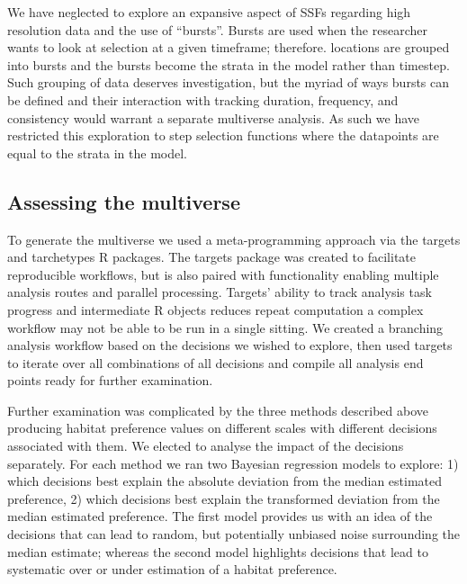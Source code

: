 \documentclass[10pt,a4paper]{article}
\begin{document}
We have neglected to explore an expansive aspect of SSFs regarding high resolution data and the use of ``bursts''.
Bursts are used when the researcher wants to look at selection at a given timeframe; therefore. locations are grouped into bursts and the bursts become the strata in the model rather than timestep.
Such grouping of data deserves investigation, but the myriad of ways bursts can be defined and their interaction with tracking duration, frequency, and consistency would warrant a separate multiverse analysis.
As such we have restricted this exploration to step selection functions where the datapoints are equal to the strata in the model.

\hypertarget{assessing-the-multiverse}{%
\subsection{Assessing the multiverse}\label{assessing-the-multiverse}}

To generate the multiverse we used a meta-programming approach via the targets and tarchetypes R packages.
The targets package was created to facilitate reproducible workflows, but is also paired with functionality enabling multiple analysis routes and parallel processing.
Targets' ability to track analysis task progress and intermediate R objects reduces repeat computation a complex workflow may not be able to be run in a single sitting.
We created a branching analysis workflow based on the decisions we wished to explore, then used targets to iterate over all combinations of all decisions and compile all analysis end points ready for further examination.

Further examination was complicated by the three methods described above producing habitat preference values on different scales with different decisions associated with them.
We elected to analyse the impact of the decisions separately.
For each method we ran two Bayesian regression models to explore: 1) which decisions best explain the absolute deviation from the median estimated preference, 2) which decisions best explain the transformed deviation from the median estimated preference.
The first model provides us with an idea of the decisions that can lead to random, but potentially unbiased noise surrounding the median estimate; whereas the second model highlights decisions that lead to systematic over or under estimation of a habitat preference.
\end{document}
